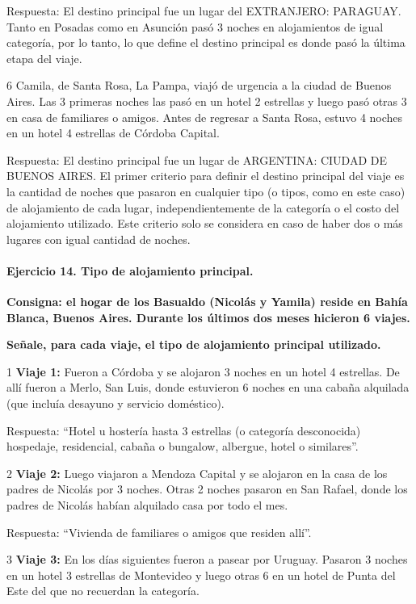 \documentclass[
  openany]{book}
\begin{document}
Respuesta: El destino principal fue un lugar del EXTRANJERO: PARAGUAY. Tanto en Posadas como en Asunción pasó 3 noches en alojamientos de igual categoría, por lo tanto, lo que define el destino principal es donde pasó la última etapa del viaje.

6 Camila, de Santa Rosa, La Pampa, viajó de urgencia a la ciudad de Buenos Aires. Las 3 primeras noches las pasó en un hotel 2 estrellas y luego pasó otras 3 en casa de familiares o amigos. Antes de regresar a Santa Rosa, estuvo 4 noches en un hotel 4 estrellas de Córdoba Capital.

Respuesta: El destino principal fue un lugar de ARGENTINA: CIUDAD DE BUENOS AIRES. El primer criterio para definir el destino principal del viaje es la cantidad de noches que pasaron en cualquier tipo (o tipos, como en este caso) de alojamiento de cada lugar, independientemente de la categoría o el costo del alojamiento utilizado. Este criterio solo se considera en caso de haber dos o más lugares con igual cantidad de noches.

\hypertarget{ejercicio-14.-tipo-de-alojamiento-principal.}{%
\paragraph{Ejercicio 14. Tipo de alojamiento principal.}\label{ejercicio-14.-tipo-de-alojamiento-principal.}}

\textbf{Consigna: el hogar de los Basualdo (Nicolás y Yamila) reside en Bahía Blanca, Buenos Aires. Durante los últimos dos meses hicieron 6 viajes.}

\textbf{Señale, para cada viaje, el tipo de alojamiento principal utilizado.}

1 \textbf{Viaje 1:} Fueron a Córdoba y se alojaron 3 noches en un hotel 4 estrellas. De allí fueron a Merlo, San Luis, donde estuvieron 6 noches en una cabaña alquilada (que incluía desayuno y servicio doméstico).

Respuesta: ``Hotel u hostería hasta 3 estrellas (o categoría desconocida) hospedaje, residencial, cabaña o bungalow, albergue, hotel o similares''.

2 \textbf{Viaje 2:} Luego viajaron a Mendoza Capital y se alojaron en la casa de los padres de Nicolás por 3 noches. Otras 2 noches pasaron en San Rafael, donde los padres de Nicolás habían alquilado casa por todo el mes.

Respuesta: ``Vivienda de familiares o amigos que residen allí''.

3 \textbf{Viaje 3:} En los días siguientes fueron a pasear por Uruguay. Pasaron 3 noches en un hotel 3 estrellas de Montevideo y luego otras 6 en un hotel de Punta del Este del que no recuerdan la categoría.
\end{document}
